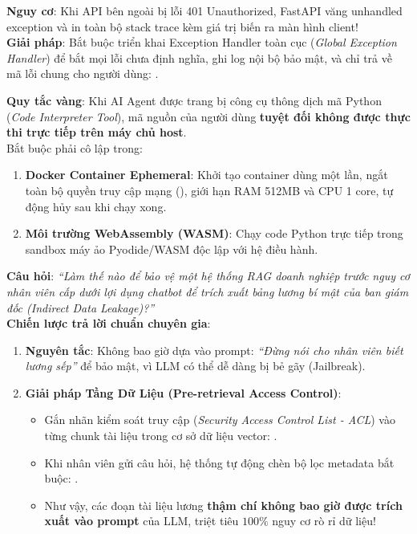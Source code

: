 \begin{debugbox}
\textbf{Nguy cơ}: Khi API bên ngoài bị lỗi 401 Unauthorized, FastAPI văng unhandled exception và in toàn bộ stack trace kèm giá trị biến  ra màn hình client!\\
\textbf{Giải pháp}: Bắt buộc triển khai Exception Handler toàn cục (\textit{Global Exception Handler}) để bắt mọi lỗi chưa định nghĩa, ghi log nội bộ bảo mật, và chỉ trả về mã lỗi chung cho người dùng: .
\end{debugbox}

\begin{securitybox}
\textbf{Quy tắc vàng}: Khi AI Agent được trang bị công cụ thông dịch mã Python (\textit{Code Interpreter Tool}), mã nguồn của người dùng \textbf{tuyệt đối không được thực thi trực tiếp trên máy chủ host}.\\
Bắt buộc phải cô lập trong:
\begin{enumerate}
  \item \textbf{Docker Container Ephemeral}: Khởi tạo container dùng một lần, ngắt toàn bộ quyền truy cập mạng (), giới hạn RAM 512MB và CPU 1 core, tự động hủy sau khi chạy xong.
  \item \textbf{Môi trường WebAssembly (WASM)}: Chạy code Python trực tiếp trong sandbox máy ảo Pyodide/WASM độc lập với hệ điều hành.
\end{enumerate}
\end{securitybox}

\begin{interviewbox}
\textbf{Câu hỏi}: \textit{``Làm thế nào để bảo vệ một hệ thống RAG doanh nghiệp trước nguy cơ nhân viên cấp dưới lợi dụng chatbot để trích xuất bảng lương bí mật của ban giám đốc (Indirect Data Leakage)?''}\\
\textbf{Chiến lược trả lời chuẩn chuyên gia}:
\begin{enumerate}
  \item \textbf{Nguyên tắc}: Không bao giờ dựa vào prompt: \textit{``Đừng nói cho nhân viên biết lương sếp''} để bảo mật, vì LLM có thể dễ dàng bị bẻ gãy (Jailbreak).
  \item \textbf{Giải pháp Tầng Dữ Liệu (Pre-retrieval Access Control)}:
    \begin{itemize}
      \item Gắn nhãn kiểm soát truy cập (\textit{Security Access Control List - ACL}) vào từng chunk tài liệu trong cơ sở dữ liệu vector: .
      \item Khi nhân viên gửi câu hỏi, hệ thống tự động chèn bộ lọc metadata bắt buộc: .
      \item Như vậy, các đoạn tài liệu lương \textbf{thậm chí không bao giờ được trích xuất vào prompt} của LLM, triệt tiêu $100\%$ nguy cơ rò rỉ dữ liệu!
    \end{itemize}
\end{enumerate}
\end{interviewbox}

